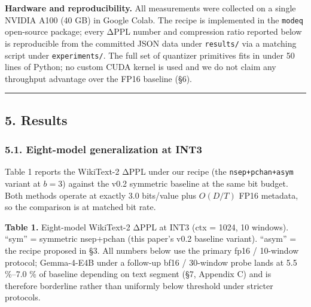 \textbf{Hardware and reproducibility.} All measurements were collected
on a single NVIDIA A100 (40 GB) in Google Colab. The recipe is
implemented in the \texttt{modeq} open-source package; every ΔPPL number
and compression ratio reported below is reproducible from the committed
JSON data under \texttt{results/} via a matching script under
\texttt{experiments/}. The full set of quantizer primitives fits in
under 50 lines of Python; no custom CUDA kernel is used and we do not
claim any throughput advantage over the FP16 baseline (§6).

\begin{center}\rule{0.5\linewidth}{0.5pt}\end{center}

\subsection{5. Results}\label{results}

\subsubsection{5.1. Eight-model generalization at
INT3}\label{eight-model-generalization-at-int3}

Table 1 reports the WikiText-2 ΔPPL under our recipe (the
\texttt{nsep+pchan+asym} variant at \(b = 3\)) against the v0.2
symmetric baseline at the same bit budget. Both methods operate at
exactly 3.0 bits/value plus \(O(D/T)\) FP16 metadata, so the comparison
is at matched bit rate.

\textbf{Table 1.} Eight-model WikiText-2 ΔPPL at INT3 (ctx = 1024, 10
windows). ``sym'' = symmetric nsep+pchan (this paper's v0.2 baseline
variant). ``asym'' = the recipe proposed in §3. All numbers below use
the primary fp16 / 10-window protocol; Gemma-4-E4B under a follow-up
bf16 / 30-window probe lands at 5.5 \%--7.0 \% of baseline depending on
text segment (§7, Appendix C) and is therefore borderline rather than
uniformly below threshold under stricter protocols.

